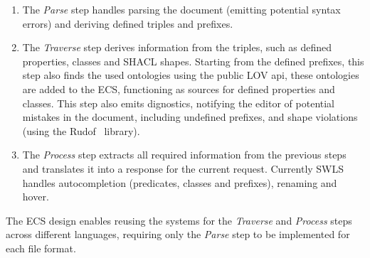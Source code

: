 \begin{enumerate}
  \item The \textit{Parse} step handles parsing the document (emitting potential syntax errors) and deriving defined triples and prefixes.

  \item The \textit{Traverse} step derives information from the triples, such as defined properties, classes and SHACL shapes. 
    Starting from the defined prefixes, this step also finds the used ontologies using the public LOV api, these ontologies are added to the ECS, functioning as sources for defined properties and classes.
        This step also emits dignostics, notifying the editor of potential mistakes in the document, including undefined prefixes, and shape violations (using the Rudof~\cite{labra2022rudof} library).

  \item The \textit{Process} step extracts all required information from the previous steps and translates it into a response for the current request.
        Currently SWLS handles autocompletion (predicates, classes and prefixes), renaming and hover.
\end{enumerate}
The ECS design enables reusing the systems for the \textit{Traverse} and \textit{Process} steps across different languages, 
requiring only the \textit{Parse} step to be implemented for each file format.

